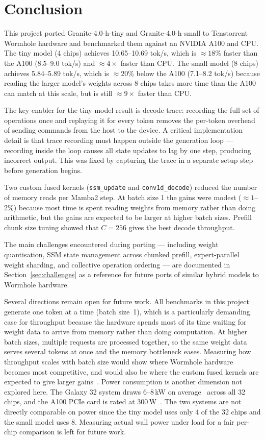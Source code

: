 \section{Conclusion}

This project ported Granite-4.0-h-tiny and Granite-4.0-h-small to Tenstorrent Wormhole hardware and benchmarked them against an NVIDIA A100 and CPU. The tiny model (4 chips) achieves 10.65--10.69 tok/s, which is ${\approx}18\%$ faster than the A100 (8.5--9.0 tok/s) and ${\approx}4\times$ faster than CPU. The small model (8 chips) achieves 5.84--5.89 tok/s, which is ${\approx}20\%$ below the A100 (7.1--8.2 tok/s) because reading the larger model's weights across 8 chips takes more time than the A100 can match at this scale, but is still ${\approx}9\times$ faster than CPU.

The key enabler for the tiny model result is decode trace: recording the full set of operations once and replaying it for every token removes the per-token overhead of sending commands from the host to the device. A critical implementation detail is that trace recording must happen outside the generation loop — recording inside the loop causes all state updates to lag by one step, producing incorrect output. This was fixed by capturing the trace in a separate setup step before generation begins.

Two custom fused kernels (\texttt{ssm\_update} and \texttt{conv1d\_decode}) reduced the number of memory reads per Mamba2 step. At batch size 1 the gains were modest (${\approx}1$--2\%) because most time is spent reading weights from memory rather than doing arithmetic, but the gains are expected to be larger at higher batch sizes. Prefill chunk size tuning showed that $C{=}256$ gives the best decode throughput.

The main challenges encountered during porting — including weight quantisation, SSM state management across chunked prefill, expert-parallel weight sharding, and collective operation ordering — are documented in Section~\ref{sec:challenges} as a reference for future ports of similar hybrid models to Wormhole hardware.

Several directions remain open for future work. All benchmarks in this project generate one token at a time (batch size~1), which is a particularly demanding case for throughput because the hardware spends most of its time waiting for weight data to arrive from memory rather than doing computation. At higher batch sizes, multiple requests are processed together, so the same weight data serves several tokens at once and the memory bottleneck eases. Measuring how throughput scales with batch size would show where Wormhole hardware becomes most competitive, and would also be where the custom fused kernels are expected to give larger gains~\citep{dao2024transformers}. Power consumption is another dimension not explored here. The Galaxy 32 system draws 6--8\,kW on average~\citep{tenstorrent_galaxy} across all 32 chips, and the A100 PCIe card is rated at 300\,W~\citep{nvidia2020a100}. The two systems are not directly comparable on power since the tiny model uses only 4 of the 32 chips and the small model uses 8. Measuring actual wall power under load for a fair per-chip comparison is left for future work.

